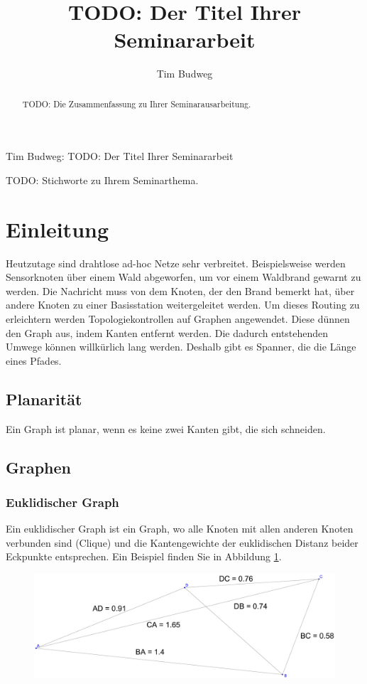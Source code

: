 \documentclass[a4paper,twoside]{IEEEtran}
\newcommand{\seminarteilnehmer}{Tim Budweg}
\newcommand{\seminartitel}{TODO: Der Titel Ihrer Seminararbeit}
\begin{document}
\title{\seminartitel}
\author{\seminarteilnehmer}

%
{\seminarteilnehmer: \seminartitel}


\maketitle

\begin{abstract}
TODO: Die Zusammenfassung zu Ihrer Seminarausarbeitung.
\end{abstract}

\begin{IEEEkeywords}
TODO: Stichworte zu Ihrem Seminarthema.
\end{IEEEkeywords}


\section{Einleitung}
Heutzutage sind drahtlose ad-hoc Netze sehr verbreitet. Beispielsweise werden Sensorknoten über einem Wald abgeworfen, um vor einem Waldbrand gewarnt zu werden. Die Nachricht muss von dem Knoten, der den Brand bemerkt hat, über andere Knoten zu einer Basisstation weitergeleitet werden. Um dieses Routing zu erleichtern werden Topologiekontrollen auf Graphen angewendet. Diese dünnen den Graph aus, indem Kanten entfernt werden. Die dadurch entstehenden Umwege können willkürlich lang werden. Deshalb gibt es Spanner, die die Länge eines Pfades.

\subsection{Planarität}
Ein Graph ist planar, wenn es keine zwei Kanten gibt, die sich schneiden.

\subsection{Graphen}
\subsubsection{Euklidischer Graph}
Ein euklidischer Graph ist ein Graph, wo alle Knoten mit allen anderen Knoten verbunden sind (Clique) und die Kantengewichte der euklidischen Distanz beider Eckpunkte entsprechen. Ein Beispiel finden Sie in Abbildung \ref{fig:Graph}.
\begin{figure}[h!]
\centering
\includegraphics[width=0.99\linewidth]{Graph.eps}
\caption{}
\label{fig:Graph}
\end{figure}
\end{document}
